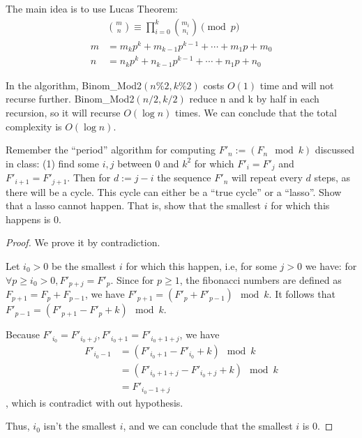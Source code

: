 \documentclass[UTF8, a4paper, linespread=1.5]{article}
\begin{document}
The main idea is to use Lucas Theorem:
\begin{align*}
	&\binom{m}{n} \equiv  \prod_{i=0}^k \binom{m_i}{n_i}\pmod p \\
	m&=m_k p^k + m_{k-1} p^{k-1}+ \cdots +m_1 p +m_0 \\
	n&=n_k p^k + n_{k-1} p^{k-1}+ \cdots +n_1 p +n_0
\end{align*}

In the algorithm, Binom\_Mod2$(n\%2,k\%2)$ costs $O(1)$ time and will not recurse further. Binom\_Mod2$(n/2,k/2)$ reduce n and k by half in each recursion, so it will recurse $O(\log n)$ times. We can conclude that the total complexity is $O(\log n)$.
\newpage
\begin{thm}{}{}
    Remember the ``period'' algorithm for computing $F'_n := (F_n \mod k)$ discussed in class: (1) find some $i,j$ between $0$ and $k^2$ for which $F'_{i} =  F'_{j}$ and $F'_{i+1} = F'_{j+1}$. Then for $d := j-i$ the sequence $F'_{n}$ will repeat every $d$ steps, as there will be a cycle. This cycle can either be a ``true cycle'' or a ``lasso''. Show that a lasso cannot happen. That is, show that the smallest $i$ for which this happens is $0$.
\end{thm}

\begin{proof}
    We prove it by contradiction.
    
    Let $i_0 > 0$ be the smallest $i$ for which this happen, i.e, for some $j > 0$ we have: for $\forall p \geqslant i_0 > 0, F'_{p + j} = F'_p$. Since for $p \geqslant 1$, the fibonacci numbers are defined as $F_{p + 1} = F_{p} + F_{p - 1}$, we have $F'_{p + 1} = (F'_p + F'_{p - 1}) \mod k$. It follows that $F'_{p - 1} = (F'_{p + 1} - F'_p + k) \mod k$.
    
    Because $F'_{i_0} = F'_{i_0 + j}, F'_{i_0 + 1} = F'_{i_0 + 1 + j}$, we have
    \begin{align*}
        F'_{i_0 - 1} &= (F'_{i_0 + 1} - F'_{i_0} + k) \mod k \\
        &= (F'_{i_0 + 1 + j} - F'_{i_0 + j} + k) \mod k \\
        &= F'_{i_0 - 1 + j}
    \end{align*}
    , which is contradict with out hypothesis.
    
    Thus, $i_0$ isn't the smallest $i$, and we can conclude that the smallest $i$ is $0$.
\end{proof}
\end{document}
